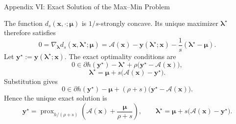 \documentclass[handout,compress,9pt]{beamer}
\newcommand{\bx}{\bm{x}}
\newcommand{\by}{\bm{y}}
\newcommand{\bmu}{\bm{\mu}}
\newcommand{\blmbd}{\bm{\lambda}}
\newcommand{\calA}{\mathcal{A}}
\begin{document}
\begin{frame}{Appendix VI: Exact Solution of the Max--Min Problem
\hfill\hyperlink{appendix:contents}{}}
\hypertarget{appendix:exact-maxmin}{}
\small

The function $d_s(\bx,\cdot;\bmu)$ is $1/s$-strongly concave. Its unique
maximizer $\blmbd^\star$ therefore satisfies
\begin{equation*}
  0=\nabla_{\blmbd}d_s(\bx,\blmbd^\star;\bmu)
  =\calA(\bx)-\by(\blmbd^\star;\bx)
  -\frac{1}{s}(\blmbd^\star-\bmu).
\end{equation*}
Let $\by^\star:=\by(\blmbd^\star;\bx)$. The exact optimality conditions are
\begin{equation*}
  0\in\partial h(\by^\star)-\blmbd^\star
  +\rho\bigl(\by^\star-\calA(\bx)\bigr),
\end{equation*}
\begin{equation*}
  \blmbd^\star
  =\bmu+s\bigl(\calA(\bx)-\by^\star\bigr).
\end{equation*}
Substitution gives
\begin{equation*}
  0\in\partial h(\by^\star)-\bmu
  +(\rho+s)\bigl(\by^\star-\calA(\bx)\bigr).
\end{equation*}
Hence the unique exact solution is
\begin{equation*}
  \boxed{
  \by^\star=\operatorname{prox}_{h/(\rho+s)}
  \left(\calA(\bx)+\frac{\bmu}{\rho+s}\right),
  \qquad
  \blmbd^\star=\bmu+s\bigl(\calA(\bx)-\by^\star\bigr).}
\end{equation*}
\end{frame}
\end{document}
